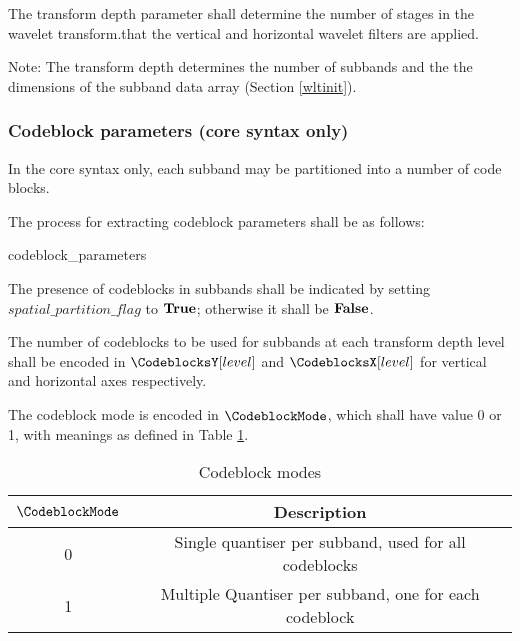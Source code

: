 The transform depth parameter shall determine the number of stages in the wavelet transform.that the vertical and horizontal wavelet filters are applied. 

Note: The transform depth determines the number of 
subbands and the the dimensions of the subband data array (Section \ref{wltinit}).

\subsubsection{Codeblock parameters (core syntax only)}
\label{spatialpartition}
\label{codeblockparams}

In the core syntax only, each subband may be partitioned into a number of code blocks. 

The process for extracting codeblock parameters shall be as follows:

\begin{pseudo}{codeblock\_parameters}{}
\bsEND
{}
    \bsEND
\bsEND
\end{pseudo}

The presence of codeblocks in subbands shall be indicated by setting $spatial\_partition\_flag$ to $\text{\bf{True}}$; otherwise it shall be $\text{\bf{False}}$.

The number of codeblocks to be used for subbands at each transform depth level shall be encoded in $\CodeblocksY[level]$ and $\CodeblocksX[level]$ for vertical and horizontal axes respectively.

The codeblock mode is encoded in $\CodeblockMode$, which shall have value 0 or 1, with meanings as defined in Table \ref{codeblockmodes}. 

\begin{table}[!ht]
\centering
\begin{tabular}{|c|c|}
\hline
 \rowcolor[gray]{0.75}$\CodeblockMode$ & {\bf Description} \\
\hline
0 & Single quantiser per subband, used for all codeblocks\\
\hline
1 & Multiple Quantiser per subband, one for each codeblock \\
\hline
\end{tabular}
\caption{Codeblock modes}\label{codeblockmodes}
\end{table}

